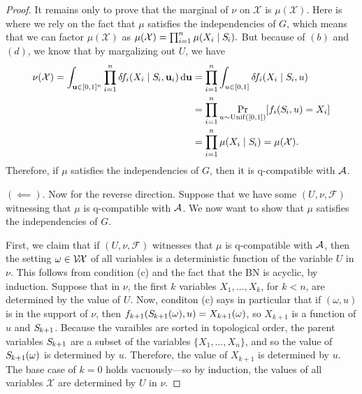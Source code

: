 \documentclass{article}
\newcommand{\X}{\mathcal X}
\begin{document}
\begin{proof}
    It remains only to prove that the marginal of $\nu$ on $\X$ is $\mu(\X)$.
    Here is where we rely on the fact that $\mu$ satisfies the independencies of $G$, which means that we can factor $\mu(\X)$ as
    $
        \mu(\X) = \prod_{i=1}^n \mu(X_i \mid \Src i).
    $
    But because of $(b)$ and $(d)$, we know that by margalizing out $U$, we have
    \begin{align*}
        \nu(\X)
            = \int_{\mat u \in [0,1]^n} \prod_{i = 1}^n  \delta \! f_i (X_i \mid \Src i, \mat u_i) \,\mathrm{d} \mat u
            &= \prod_{i = 1}^n  \int_{u \in [0,1]} \delta \! f_i (X_i \mid \Src i, u) \\
            &= \prod_{i = 1}^n  \Pr_{u \sim \mathrm{Unif}([0,1])} [ f_i (\Src i, u) = X_i] \\
            &= \prod_{i = 1}^n  \mu(X_i \mid \Src i)
            = \mu(\X).
    \end{align*}
    Therefore, if $\mu$ satisfies the independencies of $G$, then it is q-compatible with $\mathcal A$.

    \medskip

    $(\impliedby)$.
    Now for the reverse direction. Suppose that we have some $(U, \nu, \mathcal F)$ witnessing that $\mu$ is q-compatible with $\mathcal A$.
    We now want to show that $\mu$ satisfies the independencies of $G$.

    First, we claim that if $(U, \nu, \mathcal F)$ witnesses that $\mu$ is q-compatible with $\mathcal A$, then the setting $\omega \in \V\!\X$ of all variables is a deterministic function of the variable $U$ in $\nu$. This follows from condition (c) and the fact that the BN is acyclic, by induction.
    Suppose that in $\nu$, the first $k$ variables $X_1, \ldots, X_k$, for $k < n$, are determined by the value of $U$.
    Now, conditon (c) says in particular that if $(\omega, u)$ is in the support of $\nu$, then $f_{k+1}(\Src {k+1}(\omega), u) = X_{k+1}(\omega)$, so $X_{k+1}$ is a function of $u$ and $\Src {k+1}$.
    Because the varaibles are sorted in topological order, the parent variables $\Src {k+1}$ are a subset of the variables $\{X_1, \ldots, X_n\}$, and so the value of $\Src {k+1}(\omega)$ is determined by $u$.
    Therefore, the value of $X_{k+1}$ is determined by $u$.
    The base case of $k=0$ holds vacuously---so by induction, the values of all variables $\X$ are determined by $U$ in $\nu$.


\end{proof}
\end{document}
